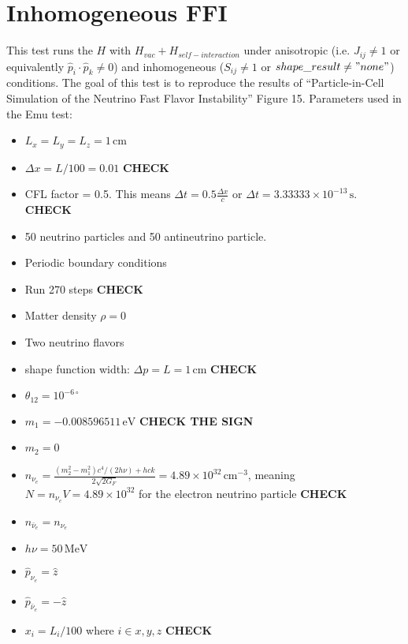 \documentclass{article}
\begin{document}
\section{Inhomogeneous FFI}
This test runs the $H$ with  $H_{vac} + H_{self-interaction} $ under anisotropic (i.e. $J_{ij}\neq 1$ or equivalently $\hat{p}_i \cdot \hat{p}_k \neq 0 $) and inhomogeneous ($S_{ij} \neq 1$ or $shape\_result\neq"none"$) conditions. The goal of this test is to reproduce the results of ``Particle-in-Cell Simulation of the Neutrino Fast Flavor Instability'' Figure 15.
Parameters used in the Emu test:
\begin{itemize}
\item $L_x=L_y=L_z=1\,\mathrm{cm}$
\item $\Delta x = L/100 = 0.01 $ \textbf{CHECK}
\item CFL factor = 0.5. This means $\Delta t = 0.5 \frac{\Delta x}{c}$ or $\Delta t = 3.33333 \times10^{-13}\,\mathrm{s}$. \textbf{CHECK}
\item 50 neutrino particles and 50 antineutrino particle.
\item Periodic boundary conditions
\item Run 270 steps \textbf{CHECK}
\item Matter density $\rho=0$
\item Two neutrino flavors
\item shape function width: $\Delta p=L=1\,\mathrm{cm}$ \textbf{CHECK}
\item $\theta_{12}=10^{-6 \circ}$
\item $m_1 = -0.008596511\,\mathrm{eV}$ \textbf{CHECK THE SIGN}
\item $m_2 = 0$
\item $n_{\nu_e}= \frac{(m_2^2 - m_1^2) c^4 / (2h\nu) + hck}{2\sqrt{2G_F}} = 4.89 \times 10^{32}\,\mathrm{cm}^{-3}$, meaning $N=n_{\nu_e}V=4.89 \times 10^{32}$ for the electron neutrino particle \textbf{CHECK}
\item $n_{\bar{\nu}_e} = n_{\nu_e}$
\item $h\nu=50\,\mathrm{MeV}$
\item $\hat{p}_{\nu_e} = \hat{z}$
\item $\hat{p}_{\bar{\nu}_e} = -\hat{z}$
\item $x_i = L_i/100$ where $i\in{x,y,z}$ \textbf{CHECK}
\end{itemize}
\end{document}
